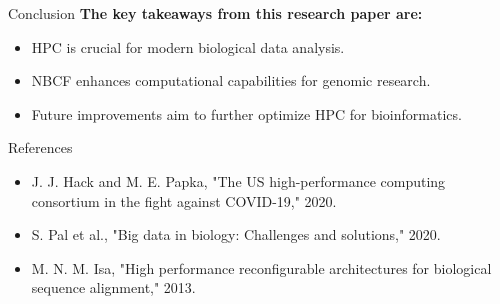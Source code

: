 \documentclass{beamer}
\begin{document}
\begin{frame}{Conclusion}
    \textbf{The key takeaways from this research paper are:}
    \begin{itemize}
        \item HPC is crucial for modern biological data analysis.
        \item NBCF enhances computational capabilities for genomic research.
        \item Future improvements aim to further optimize HPC for bioinformatics.
    \end{itemize}
\end{frame}

\begin{frame}{References}
    \begin{itemize}
        \item J. J. Hack and M. E. Papka, "The US high-performance computing consortium in the fight against COVID-19," 2020.
        \item S. Pal et al., "Big data in biology: Challenges and solutions," 2020.
        \item M. N. M. Isa, "High performance reconfigurable architectures for biological sequence alignment," 2013.
    \end{itemize}
\end{frame}
\end{document}
